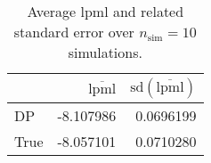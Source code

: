 \begin{table}[H]

\caption{Average lpml and related standard error over $n_{\text{sim}} = 10$ simulations.}
\centering
\begin{tabular}[t]{lrr}
\toprule
  & $\overbar{\text{lpml}}$ & $\text{sd}(\overbar{\text{lpml}})$\\
\midrule
DP & -8.107986 & 0.0696199\\
True & -8.057101 & 0.0710280\\
\bottomrule
\end{tabular}
\end{table}